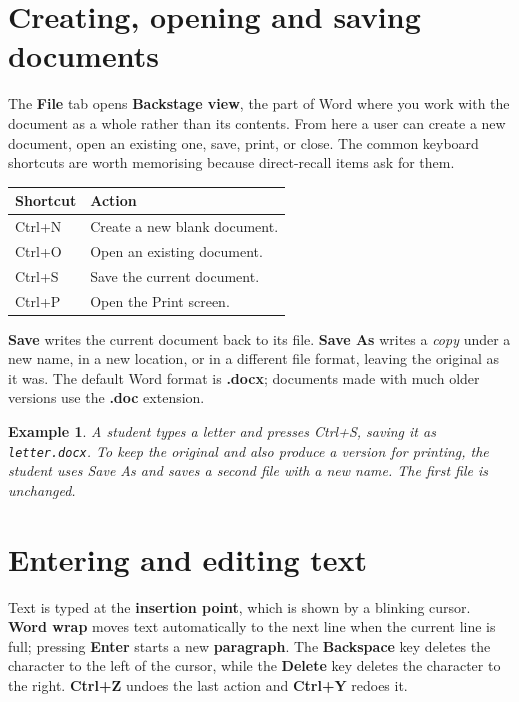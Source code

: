 \documentclass[11pt]{article}
\newtheorem{example}{Example}[section]
\begin{document}
\section{Creating, opening and saving documents}
The \textbf{File} tab opens \textbf{Backstage view}, the part of Word where
you work with the document as a whole rather than its contents. From here a
user can create a new document, open an existing one, save, print, or close.
The common keyboard shortcuts are worth memorising because direct-recall
items ask for them.

\begin{center}
\begin{tabular}{p{}p{}}
\toprule
\textbf{Shortcut} & \textbf{Action} \\
\midrule
Ctrl+N & Create a new blank document. \\
Ctrl+O & Open an existing document. \\
Ctrl+S & Save the current document. \\
Ctrl+P & Open the Print screen. \\
\bottomrule
\end{tabular}
\end{center}

\textbf{Save} writes the current document back to its file. \textbf{Save As}
writes a \emph{copy} under a new name, in a new location, or in a different
file format, leaving the original as it was. The default Word format is
\textbf{.docx}; documents made with much older versions use the \textbf{.doc}
extension.

\begin{example}
A student types a letter and presses Ctrl+S, saving it as
\texttt{letter.docx}. To keep the original and also produce a version for
printing, the student uses Save As and saves a second file with a new name.
The first file is unchanged.
\end{example}

\section{Entering and editing text}
Text is typed at the \textbf{insertion point}, which is shown by a blinking
cursor. \textbf{Word wrap} moves text automatically to the next line when
the current line is full; pressing \textbf{Enter} starts a new
\textbf{paragraph}. The \textbf{Backspace} key deletes the character to the
left of the cursor, while the \textbf{Delete} key deletes the character to
the right. \textbf{Ctrl+Z} undoes the last action and \textbf{Ctrl+Y} redoes
it.
\end{document}
